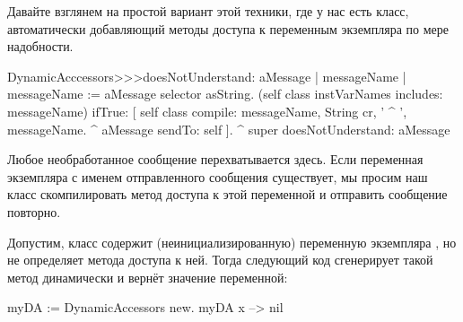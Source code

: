 \documentclass[a4paper,10pt,twoside]{book}
\begin{document}

Давайте взглянем на простой вариант этой техники, где у нас есть класс, автоматически добавляющий методы доступа к переменным экземпляра по мере надобности.

\begin{code}{}
DynamicAcccessors>>>doesNotUnderstand: aMessage
	| messageName |
	messageName := aMessage selector asString.
	(self class instVarNames includes: messageName)
		ifTrue: [
			self class compile: messageName, String cr, ' ^ ', messageName.
			^ aMessage sendTo: self ].
	^ super doesNotUnderstand: aMessage
\end{code}
Любое необработанное сообщение перехватывается здесь. Если переменная экземпляра с именем отправленного сообщения существует, мы просим наш класс скомпилировать метод доступа к этой переменной и отправить сообщение повторно.

Допустим,  класс  содержит (неинициализированную) переменную экземпляра , но не определяет метода доступа к ней. Тогда следующий код сгенерирует такой метод динамически и вернёт значение переменной:
\begin{code}{}
myDA := DynamicAccessors new.
myDA x --> nil
\end{code}
\end{document}

